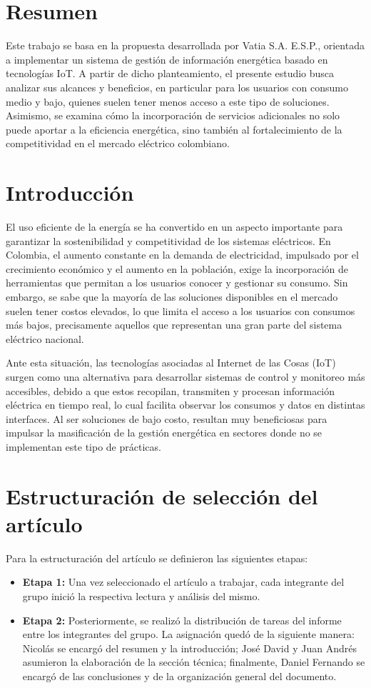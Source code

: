 \section{Resumen}
Este trabajo se basa en la propuesta desarrollada por Vatia S.A. E.S.P., orientada a implementar un sistema de gestión de información energética basado en tecnologías IoT. A partir de dicho planteamiento, el presente estudio busca analizar sus alcances y beneficios, en particular para los usuarios con consumo medio y bajo, quienes suelen tener menos acceso a este tipo de soluciones. Asimismo, se examina cómo la incorporación de servicios adicionales no solo puede aportar a la eficiencia energética, sino también al fortalecimiento de la competitividad en el mercado eléctrico colombiano.


\section{Introducción}
El uso eficiente de la energía se ha convertido en un aspecto importante para garantizar la sostenibilidad y competitividad de los sistemas eléctricos. En Colombia, el aumento constante en la demanda de electricidad, impulsado por el crecimiento económico y el aumento en la población, exige la incorporación de herramientas que permitan a los usuarios conocer y gestionar su consumo. Sin embargo, se sabe que la mayoría de las soluciones disponibles en el mercado suelen tener costos elevados, lo que limita el acceso a los usuarios con consumos más bajos, precisamente aquellos que representan una gran parte del sistema eléctrico nacional.

Ante esta situación, las tecnologías asociadas al Internet de las Cosas (IoT) surgen como una alternativa para desarrollar sistemas de control y monitoreo más accesibles, debido a que estos recopilan, transmiten y procesan información eléctrica en tiempo real, lo cual facilita observar los consumos y datos en distintas interfaces. Al ser soluciones de bajo costo, resultan muy beneficiosas para impulsar la masificación de la gestión energética en sectores donde no se implementan este tipo de prácticas.


\section{Estructuración de selección del artículo}
Para la estructuración del artículo se definieron las siguientes etapas:

\begin{itemize}
    \item \textbf{Etapa 1:} Una vez seleccionado el artículo a trabajar, cada integrante del grupo inició la respectiva lectura y análisis del mismo.
    \item \textbf{Etapa 2:} Posteriormente, se realizó la distribución de tareas del informe entre los integrantes del grupo. La asignación quedó de la siguiente manera: Nicolás se encargó del resumen y la introducción; José David y Juan Andrés asumieron la elaboración de la sección técnica; finalmente, Daniel Fernando se encargó de las conclusiones y de la organización general del documento.
\end{itemize}

